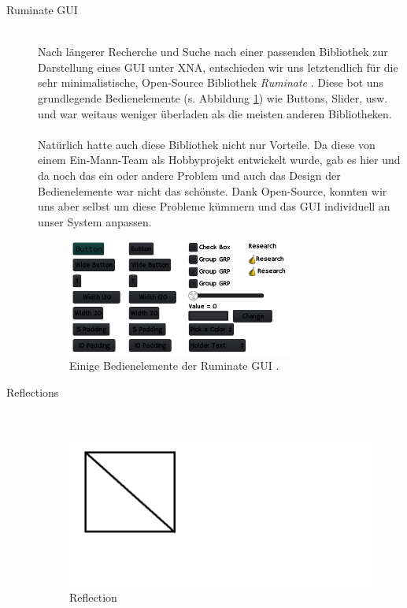 \begin{Spacing}{\mylinespace}
\begin{description}
	\item[Ruminate GUI] \hfill \\
	Nach längerer Recherche und Suche nach einer passenden Bibliothek zur Darstellung eines GUI unter XNA, entschieden wir uns letztendlich für die sehr minimalistische, Open-Source Bibliothek \textit{Ruminate} \cite{Fra13}. Diese bot uns grundlegende Bedienelemente (s. Abbildung \ref{fig:Ruminate}) wie Buttons, Slider, usw. und war weitaus weniger überladen als die meisten anderen Bibliotheken.
\\\\
Natürlich hatte auch diese Bibliothek nicht nur Vorteile. Da diese von einem Ein-Mann-Team als Hobbyprojekt entwickelt wurde, gab es hier und da noch das ein oder andere Problem und auch das Design der Bedienelemente war nicht das schönste. Dank Open-Source, konnten wir uns aber selbst um diese Probleme kümmern und das GUI individuell an unser System anpassen.
	
\begin{figure}[h!]
	\centering
	\vspace*{20px}
	\includegraphics[width=280px]{graphics/ruminate.png}	
	\caption{Einige Bedienelemente der Ruminate GUI \cite{Fra13}.}
	\label{fig:Ruminate}
\end{figure}
	
	\item[Reflections] \hfill \\
	
	
\begin{figure}[h!]
	\vspace*{30px}
	\includegraphics[width=\columnwidth]{graphics/reflection.png}	
	\caption{Reflection}
	\label{fig:Reflection}
\end{figure}
	

\end{description}
\end{Spacing}
